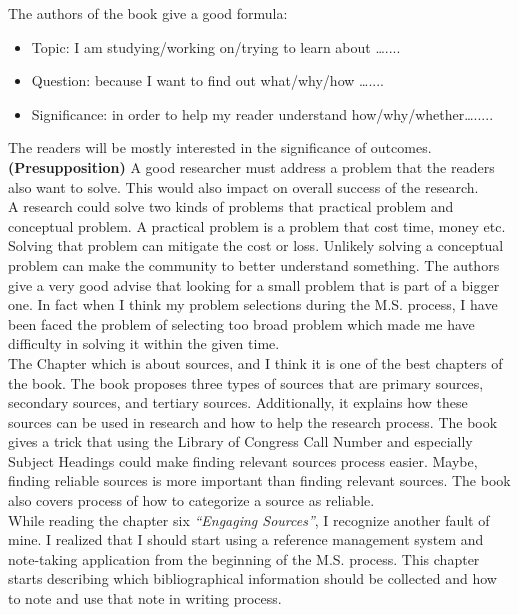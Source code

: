 \documentclass[11pt]{article} %
\begin{document}
The authors of the book give a good formula:
	\begin{itemize}
		\item Topic: I am studying/working on/trying to learn about …....
		\item Question: because I want to find out what/why/how …....
		\item Significance: in order to help my reader understand how/why/whether….....
	\end{itemize}
	
	The readers will be mostly interested in the significance of outcomes. \textbf{(Presupposition)} A good researcher must address a problem that the readers also want to solve. This would also impact on overall success of the research.\\

A research could solve two kinds of problems that practical problem and conceptual problem. A practical problem is a problem that cost time, money etc. Solving that problem can mitigate the cost or loss. Unlikely solving a conceptual problem can make the community to better understand something. The authors give a very good advise that looking for a small problem that is part of a bigger one. In fact when I think my problem selections during the M.S. process, I have been faced the problem of selecting too broad problem which made me have difficulty in solving it within the given time.\\
 
The Chapter which is about sources, and I think it is one of the best chapters of the book. The book proposes three types of sources that are primary sources, secondary sources, and tertiary sources. Additionally, it explains how these sources can be used in research and how to help the research process. The book gives a trick that using the Library of Congress Call Number and especially Subject Headings could make finding relevant sources process easier. Maybe, finding reliable sources is more important than finding relevant sources. The book also covers process of how to categorize a source as reliable.\\

While reading the chapter six \textit{“Engaging Sources”}, I recognize another fault of mine. I realized that I should start using a reference management system and note-taking application from the beginning of the M.S. process. This chapter starts describing which bibliographical information should be collected and how to note and use that note in writing process. \\
\end{document}
